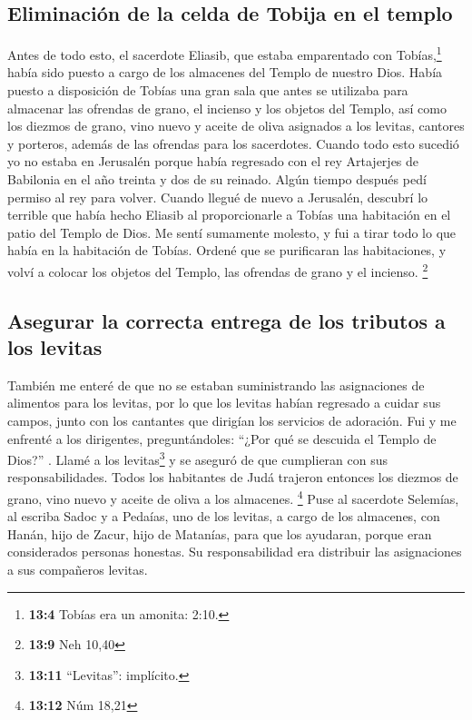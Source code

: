 \hypertarget{eliminaciuxf3n-de-la-celda-de-tobija-en-el-templo}{%
\subsection{Eliminación de la celda de Tobija en el
templo}\label{eliminaciuxf3n-de-la-celda-de-tobija-en-el-templo}}

 Antes de todo esto, el sacerdote Eliasib, que estaba
emparentado con Tobías,\footnote{\textbf{13:4} Tobías era un amonita:
  2:10.} había sido puesto a cargo de los almacenes del Templo de
nuestro Dios.  Había puesto a disposición de Tobías una
gran sala que antes se utilizaba para almacenar las ofrendas de grano,
el incienso y los objetos del Templo, así como los diezmos de grano,
vino nuevo y aceite de oliva asignados a los levitas, cantores y
porteros, además de las ofrendas para los sacerdotes. 
Cuando todo esto sucedió yo no estaba en Jerusalén porque había
regresado con el rey Artajerjes de Babilonia en el año treinta y dos de
su reinado. Algún tiempo después pedí permiso al rey para volver.
 Cuando llegué de nuevo a Jerusalén, descubrí lo terrible
que había hecho Eliasib al proporcionarle a Tobías una habitación en el
patio del Templo de Dios.  Me sentí sumamente molesto, y
fui a tirar todo lo que había en la habitación de Tobías. 
Ordené que se purificaran las habitaciones, y volví a colocar los
objetos del Templo, las ofrendas de grano y el incienso. \footnote{\textbf{13:9}
  Neh 10,40}

\hypertarget{asegurar-la-correcta-entrega-de-los-tributos-a-los-levitas}{%
\subsection{Asegurar la correcta entrega de los tributos a los
levitas}\label{asegurar-la-correcta-entrega-de-los-tributos-a-los-levitas}}

 También me enteré de que no se estaban suministrando las
asignaciones de alimentos para los levitas, por lo que los levitas
habían regresado a cuidar sus campos, junto con los cantantes que
dirigían los servicios de adoración.  Fui y me enfrenté a
los dirigentes, preguntándoles: ``¿Por qué se descuida el Templo de
Dios?'' . Llamé a los levitas\footnote{\textbf{13:11} ``Levitas'':
  implícito.} y se aseguró de que cumplieran con sus responsabilidades.
 Todos los habitantes de Judá trajeron entonces los
diezmos de grano, vino nuevo y aceite de oliva a los almacenes.
\footnote{\textbf{13:12} Núm 18,21}  Puse al sacerdote
Selemías, al escriba Sadoc y a Pedaías, uno de los levitas, a cargo de
los almacenes, con Hanán, hijo de Zacur, hijo de Matanías, para que los
ayudaran, porque eran considerados personas honestas. Su responsabilidad
era distribuir las asignaciones a sus compañeros levitas.

